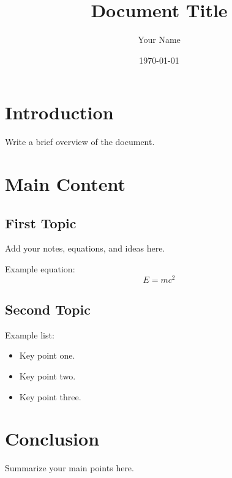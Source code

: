 \documentclass[12pt,letterpaper]{article}
\title{Document Title}
\author{Your Name}
\date{\today}
\begin{document}
\maketitle
\tableofcontents
\newpage

\section{Introduction}
Write a brief overview of the document.

\section{Main Content}
\subsection{First Topic}
Add your notes, equations, and ideas here.

Example equation:
\begin{equation}
  E = mc^2
\end{equation}

\subsection{Second Topic}
Example list:
\begin{itemize}[leftmargin=*]
  \item Key point one.
  \item Key point two.
  \item Key point three.
\end{itemize}

\section{Conclusion}
Summarize your main points here.
\end{document}
